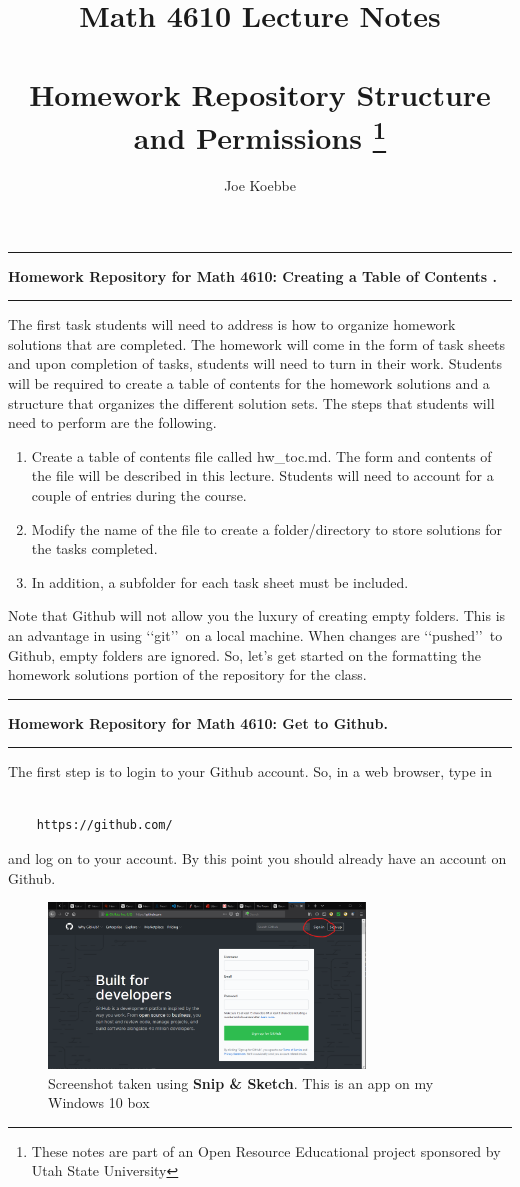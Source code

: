 \documentclass[10pt,fleqn]{article}
\title{Math 4610 Lecture Notes \\
            \ \\
       Homework Repository Structure and Permissions 
  \footnote{These notes are part of an Open Resource Educational project
            sponsored by Utah State University}}
\author{Joe Koebbe}
\begin{document}
\maketitle
\newpage
\vskip0.1in\hrule\vskip0.1in
\noindent
{\bf Homework Repository for Math 4610: Creating a Table of Contents .} 
\vskip0.1in\hrule\vskip0.1in
\noindent
The first task students will need to address is how to organize homework
solutions that are completed. The homework will come in the form of task sheets
and upon completion of tasks, students will need to turn in their work. Students
will be required to create a table of contents for the homework solutions and a
structure that organizes the different solution sets. The steps that students
will need to perform are the following.
\begin{enumerate}
  \item Create a table of contents file called hw\_toc.md. The form and contents
        of the file will be described in this lecture. Students will need to
        account for a couple of entries during the course.
  \item Modify the name of the file to create a folder/directory to store
        solutions for the tasks completed.
  \item In addition, a subfolder for each task sheet must be included.
\end{enumerate}
Note that Github will not allow you the luxury of creating empty folders. This
is an advantage in using \lq\lq git\rq\rq\ on a local machine. When changes are
\lq\lq pushed\rq\rq\ to Github, empty folders are ignored. So, let's get started
on the formatting the homework solutions portion of the repository for the
class.
\newpage
\vskip0.1in\hrule\vskip0.1in
\noindent
{\bf Homework Repository for Math 4610: Get to Github.} 
\vskip0.1in\hrule\vskip0.1in
The first step is to login to your Github account. So, in a web browser, type in
\begin{verbatim}

    https://github.com/

\end{verbatim}
and log on to your account. By this point you should already have an account on
Github.
\vfill
\begin{figure}[h]
\centering
\includegraphics[width=0.75\textwidth]{../images/github_01.png}
\caption{{Screenshot} taken using {\bf Snip \& Sketch}. This is an app on
         my Windows 10 box}
\end{figure}
\end{document}
